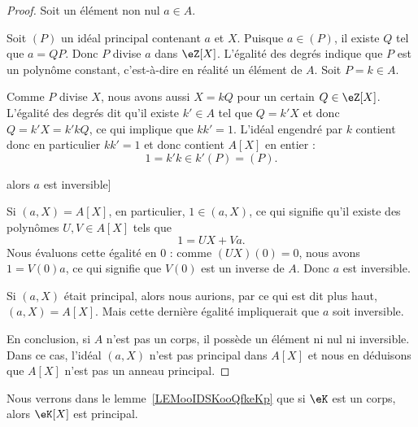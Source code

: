 \begin{proof}
	Soit un élément non nul \( a\in A\).
	\begin{subproof}
		\newcommand{\foo}{A[X]}

		Soit \( (P)\) un idéal principal contenant \( a\) et \( X\). Puisque \( a\in(P)\), il existe \( Q\) tel que \( a=QP\). Donc \( P\) divise \( a\) dans \( \eZ[X]\). L'égalité des degrés indique que \( P\) est un polynôme constant, c'est-à-dire en réalité un élément de \( A\). Soit \( P=k\in A\).

		Comme \( P\) divise \( X\), nous avons aussi \( X=kQ\) pour un certain \( Q\in \eZ[X]\). L'égalité des degrés dit qu'il existe \( k'\in A\) tel que \( Q=k'X\) et donc \( Q=k'X=k'kQ\), ce qui implique que \( kk'=1\). L'idéal engendré par \( k\) contient donc en particulier \( kk'=1\) et donc contient \( A[X]\) en entier :
		\begin{equation}
			1=k'k\in k'(P)=(P).
		\end{equation}

		\spitem[Si \( (a,X)=\foo\) alors \( a\) est inversible]

		Si \( (a,X)=A[X]\), en particulier, \( 1\in (a,X)\), ce qui signifie qu'il existe des polynômes \( U,V\in A[X]\) tels que
		\begin{equation}
			1=UX+Va.
		\end{equation}
		Nous évaluons cette égalité en \( 0\) : comme \( (UX)(0)=0\), nous avons \( 1=V(0)a\), ce qui signifie que \( V(0)\) est un inverse de \( A\). Donc \( a\) est inversible.


		Si \( (a,X)\) était principal, alors nous aurions, par ce qui est dit plus haut, \( (a,X)=A[X]\). Mais cette dernière égalité impliquerait que \( a\) soit inversible.
	\end{subproof}
	En conclusion, si \( A\) n'est pas un corps, il possède un élément ni nul ni inversible. Dans ce cas, l'idéal \( (a,X)\) n'est pas principal dans \( A[X]\) et nous en déduisons que \( A[X]\) n'est pas un anneau principal.
\end{proof}

Nous verrons dans le lemme~\ref{LEMooIDSKooQfkeKp} que si \( \eK\) est un corps, alors \( \eK[X]\) est principal.


